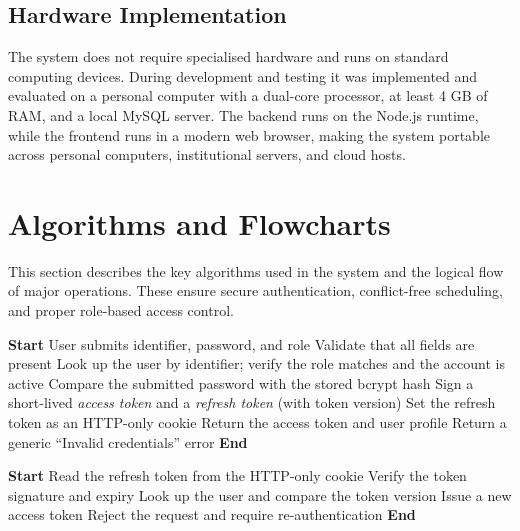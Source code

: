 \documentclass[12pt,a4paper]{report}
\begin{document}
\subsection{Hardware Implementation}
The system does not require specialised hardware and runs on standard computing devices.
During development and testing it was implemented and evaluated on a personal computer
with a dual-core processor, at least 4 GB of RAM, and a local MySQL server. The backend
runs on the Node.js runtime, while the frontend runs in a modern web browser, making the
system portable across personal computers, institutional servers, and cloud hosts.

\section{Algorithms and Flowcharts}
This section describes the key algorithms used in the system and the logical flow of
major operations. These ensure secure authentication, conflict-free scheduling, and
proper role-based access control.

\begin{algorithm}[htbp]
\caption{User Login (JWT)}
\begin{algorithmic}[1]
\State \textbf{Start}
\State User submits identifier, password, and role
\State Validate that all fields are present
\State Look up the user by identifier; verify the role matches and the account is active
\State Compare the submitted password with the stored bcrypt hash
  \State Sign a short-lived \emph{access token} and a \emph{refresh token} (with token version)
  \State Set the refresh token as an HTTP-only cookie
  \State Return the access token and user profile
\Else
  \State Return a generic ``Invalid credentials'' error
\EndIf
\State \textbf{End}
\end{algorithmic}
\end{algorithm}

\begin{algorithm}[htbp]
\caption{Access-Token Refresh with Rotation}
\begin{algorithmic}[1]
\State \textbf{Start}
\State Read the refresh token from the HTTP-only cookie
\State Verify the token signature and expiry
\State Look up the user and compare the token version
  \State Issue a new access token
\Else
  \State Reject the request and require re-authentication
\EndIf
\State \textbf{End}
\end{algorithmic}
\end{algorithm}
\end{document}
